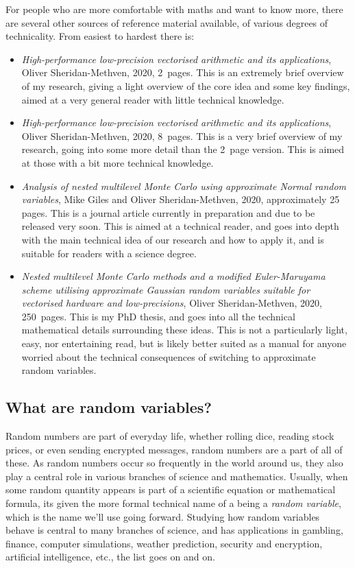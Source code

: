 \documentclass[11pt,a4paper,twoside,english]{extarticle}
\begin{document}
For people who are more comfortable with maths and want to know more, there are several other sources of reference material available, of various degrees of technicality. From easiest to hardest there is:
\begin{itemize}
\item \emph{High-performance low-precision vectorised arithmetic and its applications}, Oliver Sheridan-Methven, 2020, 2~pages. This is an extremely brief overview of my research, giving a light overview of the core idea and some key findings, aimed at a very general reader with little technical knowledge. 

\item \emph{High-performance low-precision vectorised arithmetic and its applications}, Oliver Sheridan-Methven, 2020, 8~pages. This is a very brief overview of my research, going into some more detail than the 2~page version. This is aimed at those with a bit more technical knowledge. 

\item \emph{Analysis of nested multilevel Monte Carlo using approximate Normal random variables}, Mike Giles and Oliver Sheridan-Methven, 2020,  approximately 25 pages. This is a journal article currently in preparation and due to be released very soon. This is aimed at a technical reader, and goes into depth with the main technical idea of our research and how to apply it, and is suitable for readers with a science degree.

\item \emph{Nested multilevel Monte Carlo methods and a modified Euler-Maruyama scheme utilising approximate Gaussian random variables suitable for vectorised hardware and low-precisions}, Oliver Sheridan-Methven, 2020, 250~pages. This is my PhD thesis, and goes into all the technical mathematical details surrounding these ideas. This is not a particularly light, easy, nor entertaining read, but is likely better suited as a manual for anyone worried about the technical consequences of switching to approximate random variables. 
\end{itemize}


\subsection{What are random variables?}

Random numbers are part of everyday life, whether rolling dice, reading stock prices, or even sending encrypted messages, random numbers are a part of all of these. As random numbers occur so frequently in the world around us, they also play a central role in various branches of science and mathematics. Usually, when some random quantity appears is part of a scientific equation or mathematical formula, its given the more formal technical name of a being a \emph{random variable}, which is the name we'll use going forward. Studying how random variables behave is central to many branches of science, and has applications in gambling, finance, computer simulations, weather prediction, security and encryption, artificial intelligence, etc., the list goes on and on.  
\end{document}
